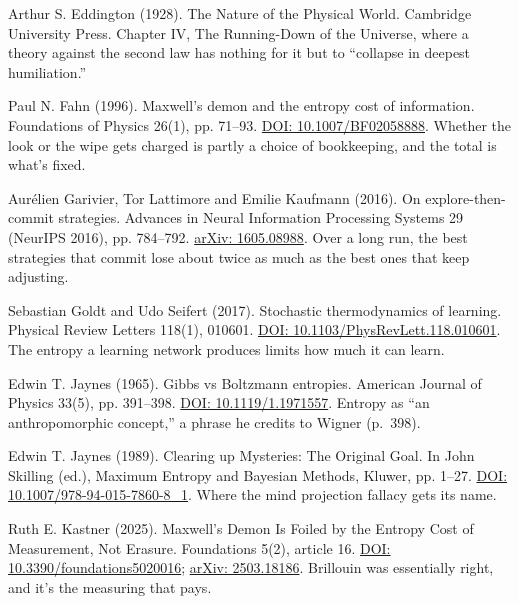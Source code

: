 \documentclass[11pt,twoside]{article}
\theoremstyle{thielethm}
\theoremstyle{thieledef}
\theoremstyle{thieledef}
\theoremstyle{thieledef}
\theoremstyle{thielethm}
\theoremstyle{thieleobs}
\theoremstyle{thielethm}
\begin{document}
\noindent Arthur S. Eddington (1928). The Nature of the Physical World. Cambridge University Press. Chapter IV, The Running-Down of the Universe, where a theory against the second law has nothing for it but to ``collapse in deepest humiliation.''
\par\medskip

\noindent Paul N. Fahn (1996). Maxwell's demon and the entropy cost of information. Foundations of Physics 26(1), pp. 71--93. \href{https://doi.org/10.1007/BF02058888}{DOI: 10.1007/BF02058888}. Whether the look or the wipe gets charged is partly a choice of bookkeeping, and the total is what's fixed.
\par\medskip

\noindent Aur\'elien Garivier, Tor Lattimore and Emilie Kaufmann (2016). On explore-then-commit strategies. Advances in Neural Information Processing Systems 29 (NeurIPS 2016), pp. 784--792. \href{https://arxiv.org/abs/1605.08988}{arXiv: 1605.08988}. Over a long run, the best strategies that commit lose about twice as much as the best ones that keep adjusting.
\par\medskip

\noindent Sebastian Goldt and Udo Seifert (2017). Stochastic thermodynamics of learning. Physical Review Letters 118(1), 010601. \href{https://doi.org/10.1103/PhysRevLett.118.010601}{DOI: 10.1103/PhysRevLett.118.010601}. The entropy a learning network produces limits how much it can learn.
\par\medskip

\noindent Edwin T. Jaynes (1965). Gibbs vs Boltzmann entropies. American Journal of Physics 33(5), pp. 391--398. \href{https://doi.org/10.1119/1.1971557}{DOI: 10.1119/1.1971557}. Entropy as ``an anthropomorphic concept,'' a phrase he credits to Wigner (p.~398).
\par\medskip

\noindent Edwin T. Jaynes (1989). Clearing up Mysteries: The Original Goal. In John Skilling (ed.), Maximum Entropy and Bayesian Methods, Kluwer, pp. 1--27. \href{https://doi.org/10.1007/978-94-015-7860-8_1}{DOI: 10.1007/978-94-015-7860-8\_1}. Where the mind projection fallacy gets its name.
\par\medskip

\noindent Ruth E. Kastner (2025). Maxwell's Demon Is Foiled by the Entropy Cost of Measurement, Not Erasure. Foundations 5(2), article 16. \href{https://doi.org/10.3390/foundations5020016}{DOI: 10.3390/foundations5020016}; \href{https://arxiv.org/abs/2503.18186}{arXiv: 2503.18186}. Brillouin was essentially right, and it's the measuring that pays.
\par\medskip
\end{document}
